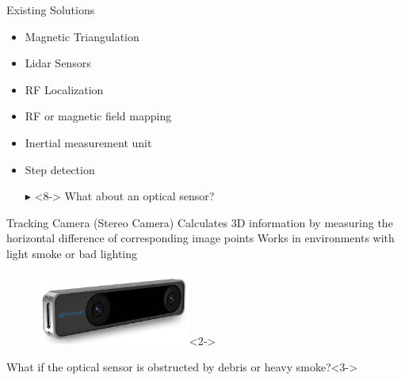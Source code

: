 \documentclass[aspectratio=169,handout]{beamer}
\begin{document}
{	\begin{frame}{Existing Solutions}
		\begin{itemize}
			\item<2-> Magnetic Triangulation %
			\item<3-> Lidar Sensors %
			\item<4-> RF Localization 
			\item<5-> RF or magnetic field mapping%
			\item<6-> Inertial measurement unit %
			\item<7-> Step detection %
			\item[$\blacktriangleright$]<8-> What about an optical sensor?
		\end{itemize}
	\end{frame}
	
	
	\begin{frame}{Tracking Camera (Stereo Camera)}
		 Calculates 3D information by measuring the horizontal difference of corresponding image points
		 Works in environments with light smoke or bad lighting
	
		
		
		\begin{figure}
			\centering
			\includegraphics[width=0.45\textwidth]{realsense.jpg}<2->
		\end{figure}
		
			\begin{block}{What if the optical sensor is obstructed by debris or heavy smoke?}<3->
		\end{block}
	\end{frame}
	

}
\end{document}
